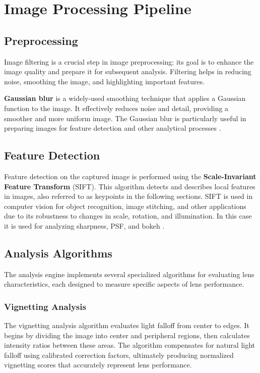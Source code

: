 \section{Image Processing Pipeline}

\subsection{Preprocessing}
Image filtering is a crucial step in image preprocessing; its goal is to enhance the image quality and prepare it for subsequent analysis. Filtering helps in reducing noise, smoothing the image, and highlighting important features.

\textbf{Gaussian blur} is a widely-used smoothing technique that applies a Gaussian function to the image. It effectively reduces noise and detail, providing a smoother and more uniform image. The Gaussian blur is particularly useful in preparing images for feature detection and other analytical processes \cite{gaussian}.

\subsection{Feature Detection}
Feature detection on the captured image is performed using the \textbf{Scale-Invariant Feature Transform} (SIFT). This algorithm detects and describes local features in images, also referred to as keypoints in the following sections. SIFT is used in computer vision for object recognition, image stitching, and other applications due to its robustness to changes in scale, rotation, and illumination. In this case it is used for analyzing sharpness, PSF, and bokeh \cite{Sift}.

\subsection{Analysis Algorithms}
The analysis engine implements several specialized algorithms for evaluating lens characteristics, each designed to measure specific aspects of lens performance.

\subsubsection{Vignetting Analysis}
The vignetting analysis algorithm evaluates light falloff from center to edges. It begins by dividing the image into center and peripheral regions, then calculates intensity ratios between these areas. The algorithm compensates for natural light falloff using calibrated correction factors, ultimately producing normalized vignetting scores that accurately represent lens performance.

